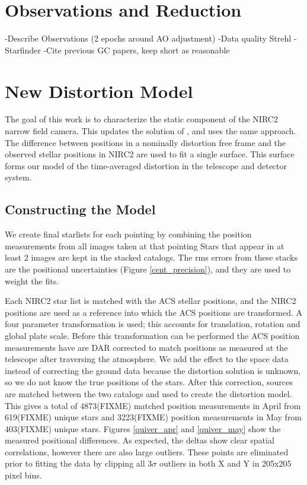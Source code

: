 \section{Observations and Reduction}
-Describe Observations (2 epochs around AO adjustment)
-Data quality Strehl
-Starfinder
-Cite previous GC papers, keep short as reasonable

\section{New Distortion Model}
The goal of this work is to characterize the static component of the NIRC2 narrow field camera.  This updates the solution of \cite{Yelda_2010}, and uses the same approach.  The difference between positions in a nominally distortion free frame and the observed stellar positions in NIRC2 are used to fit a single surface.  This surface forms our model of the time-averaged distortion  in the telescope and detector system.

\subsection{Constructing the Model}
We create final starlists for each pointing by combining the position measurements from all images taken at that pointing  Stars that appear in at least 2 images are kept in the stacked catalogs.  The rms errors from these stacks are the positional uncertainties (Figure \ref{cent_precision}), and they are used to weight the fits.

Each NIRC2 star list is matched with the ACS stellar positions, and the NIRC2 positions are used as a reference into which the ACS positions are transformed.  A four parameter transformation is used; this accounts for translation, rotation and global plate scale.  Before this transformation can be performed the ACS position measurements have are DAR corrected to match positions as measured at the telescope after traversing the atmosphere.  We add the effect to the space data instead of correcting the ground data because the distortion solution is unknown, so we do not know the true positions of the stars.  After this correction, sources are matched between the two catalogs and used to create the distortion model.  This gives a total of 4873(FIXME) matched position measurements in April from 619(FIXME) unique stars  and 3223(FIXME) position measurements in May from 403(FIXME) unique stars.  Figures \ref{quiver_apr} and \ref{quiver_may} show the measured positional differences.  As expected, the deltas show clear spatial correlations, however there are also large outliers.  These points are eliminated prior to fitting the data by clipping all 3$\sigma$ outliers in both X and Y in 205x205 pixel bins.  



